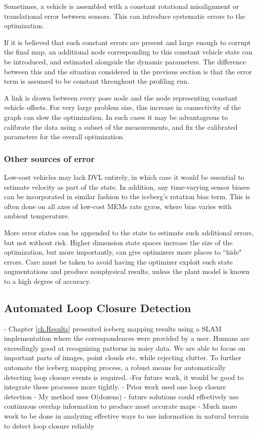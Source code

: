 Sometimes, a vehicle is assembled with a constant rotational misalignment or translational error between sensors. This can introduce systematic errors to the optimization.

If it is believed that such constant errors are present and large enough to corrupt the final map, an additional node corresponding to this constant vehicle state can be introduced, and estimated alongside the dynamic parameters. The difference between this and the situation considered in the previous section is that the error term is assumed to be constant throughout the profiling run. 

A link is drawn between every pose node and the node representing constant vehicle offsets. For very large problem size, this increase in connectivity of the graph can slow the optimization. In such cases it may be advantageous to calibrate the data using a subset of the measurements, and fix the calibrated parameters for the overall optimization. 

\subsubsection{Other sources of error}

Low-cost vehicles may lack DVL entirely, in which case it would be essential to estimate velocity as part of the state. In addition, any time-varying sensor biases can be incorporated in similar fashion to the iceberg's rotation bias term. This is often done on all axes of low-cost MEMs rate gyros, where bias varies with ambient temperature. 

More error states can be appended to the state to estimate such additional errors, but not without risk. Higher dimension state spaces increase the size of the optimization, but more importantly, can give optimizers more places to ``hide" errors. Care must be taken to avoid having the optimizer exploit such state augmentations and produce nonphysical results, unless the plant model is known to a high degree of accuracy.

\subsection{Automated Loop Closure Detection}
- Chapter \ref{ch.Results} presented iceberg mapping results using a SLAM implementation where the correspondences were provided by a user. Humans are exceedingly good at recognizing patterns in noisy data. We are able to focus on important parts of images, point clouds etc. while rejecting clutter. To further automate the iceberg mapping process, a robust means for automatically detecting loop closure events is required. 
-For future work, it would be good to integrate these processes more tightly.
	- Prior work used one loop closure detection
	- My method uses O(dozens)
	- future solutions could effectively use continuous overlap information to produce most accurate maps
- Much more work to be done in analyzing effective ways to use information in natural terrain to detect loop closure reliably

